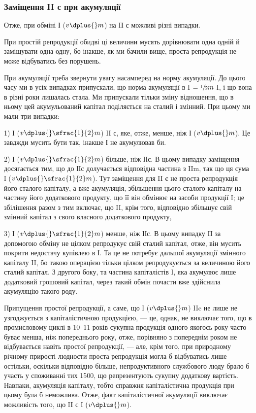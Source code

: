 \subsubsection{Заміщення II с при акумуляції}

Отже, при обміні І ($v \dplus{} m$) на II с можливі різні випадки.

При простій репродукції обидві ці величини мусять дорівнювати одна
одній й заміщувати одна одну, бо інакше, як ми бачили вище, проста
репродукція не може відбуватись без порушень.

При акумуляції треба звернути увагу насамперед на норму акумуляції.
До цього часу ми в усіх випадках припускали, що норма акумуляції в I $=\sfrac{1}{2}m$ I,
і що вона в різні роки лишалась стала. Ми припускали
тільки зміну відношення, що в ньому цей акумульований капітал поділяється
на сталий і змінний. При цьому ми мали три випадки:

1) І ($v \dplus{} \sfrac{1}{2}m$) \deq{} II с, яке, отже, менше, ніж І ($v \dplus{} m$). Це завджди
мусить бути так, інакше І не акумулював би.

2) І ($v \dplus{} \sfrac{1}{2}m$) більше, ніж ІІс. В цьому випадку заміщення досягається
тим, що до ІІс долучається відповідна частина з IIm, так що
ця сума \deq{} І ($v \dplus{} \sfrac{1}{2} m$). Тут заміщення для II є не проста репродукція
його сталого капіталу, а вже акумуляція, збільшення цього сталого капіталу
на частину його додаткового продукту, що її він обмінює на засоби
продукції І; це збілішення разом з тим включає, що II, крім того, відповідно
збільшує свій змінний капітал з свого власного додаткового продукту,

3) І ($v \dplus{} \sfrac{1}{2}m$) менше, ніж ІІс. В цьому випадку II за допомогою
обміну не цілком репродукує свій сталий капітал, отже, він мусить покрити
недостачу купівлею в І. Та це не потребує дальшої акумуляції
змінного капіталу II, бо такою операцією тільки цілком репродукується
за величиною його сталий капітал. З другого боку, та частина капіталістів
І, яка акумулює лише додатковий грошовий капітал, через такий
обмін почасти вже здійснила акумуляцію такого роду.

Припущення простої репродукції, а саме, що І ($v \dplus{} m$) \deq{} IIc не лише
не узгоджується з капіталістичною продукцією, — це, однак, не виключає
того, що в промисловому циклі в 10--11 років сукупна продукція одного
якогось року часто буває менша, ніж попереднього року, отже,
порівняно з попереднім роком не відбувається навіть простої репродукції,
— але, крім того, при природному річному прирості людности проста
репродукція могла б відбуватись лише остільки, оскільки відповідно
більше, непродуктивного службового люду брало б участь у споживанні
тих 1500, що репрезентують сукупну додаткову вартість. Навпаки, акумуляція
капіталу, тобто справжня капіталістична продукція при цьому
була б неможлива. Отже, факт капіталістичної акумуляції виключає можливість того, що II с \deq{} І ($v \dplus{} m$).

